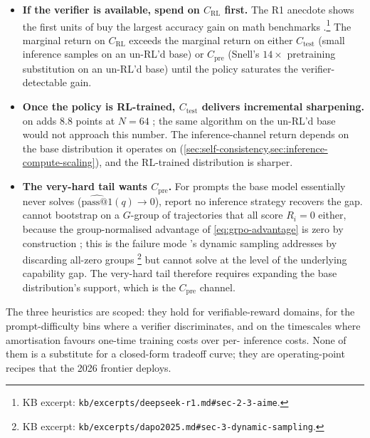 \begin{itemize}
\item \textbf{If the verifier is available, spend on $C_\text{RL}$
first.} The R1 anecdote shows the first units of  buy the largest
accuracy gain on math benchmarks
\citep[\S 2.3]{deepseek-r1}.\footnote{KB excerpt:
\texttt{kb/excerpts/deepseek-r1.md\#sec-2-3-aime}.} The marginal
return on $C_\text{RL}$ exceeds the marginal return on either
$C_\text{test}$ (small inference samples on an un-RL'd base) or
$C_\text{pre}$ (Snell's $14\times$ pretraining substitution on an
un-RL'd base) until the policy saturates the verifier-detectable
gain.
\item \textbf{Once the policy is RL-trained, $C_\text{test}$ delivers
incremental sharpening.}  on  adds $8.8$
points at $N = 64$ \citep[\S 2.3]{deepseek-r1}; the same algorithm
on the un-RL'd base would not approach this number. The
inference-channel return depends on the base distribution it operates
on (\cref{sec:self-consistency,sec:inference-compute-scaling}),
and the RL-trained distribution is sharper.
\item \textbf{The very-hard tail wants $C_\text{pre}$.} For prompts
the base model essentially never solves
($\widehat{\mathrm{pass@}1}(q) \to 0$),
\citet[\S 6]{snell2024} report no inference strategy recovers the
gap.  cannot bootstrap on a $G$-group of trajectories that all
score $R_i = 0$ either, because the group-normalised advantage of
\cref{eq:grpo-advantage} is zero by construction
\citep[\S 4.1]{shao2024}; this is the failure mode 's dynamic
sampling addresses by discarding all-zero groups
\citep[\S 3]{dapo2025}\footnote{KB excerpt:
\texttt{kb/excerpts/dapo2025.md\#sec-3-dynamic-sampling}.} but cannot
solve at the level of the underlying capability gap. The very-hard
tail therefore requires expanding the base distribution's support,
which is the $C_\text{pre}$ channel.
\end{itemize}

The three heuristics are scoped: they hold for verifiable-reward
domains, for the prompt-difficulty bins where a verifier discriminates,
and on the timescales where amortisation favours one-time training
costs over per- inference costs. None of them is a substitute for
a closed-form tradeoff curve; they are operating-point recipes that
the 2026 frontier deploys.

